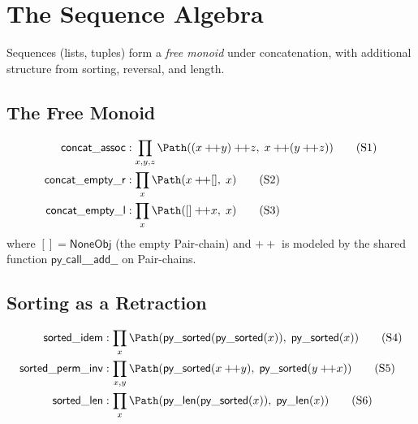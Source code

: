 \section{The Sequence Algebra}

Sequences (lists, tuples) form a \emph{free monoid} under
concatenation, with additional structure from sorting, reversal,
and length.

\subsection{The Free Monoid}

\begin{definition}
\begin{align}
  \mathsf{concat\_assoc} &: \prod_{x,y,z}
    \Path((x +\!\!+ y) +\!\!+ z,\;
          x +\!\!+ (y +\!\!+ z))
    \tag{S1} \\
  \mathsf{concat\_empty\_r} &: \prod_x
    \Path(x +\!\!+ [],\; x)
    \tag{S2} \\
  \mathsf{concat\_empty\_l} &: \prod_x
    \Path([] +\!\!+ x,\; x)
    \tag{S3}
\end{align}
where $[] = \mathsf{NoneObj}$ (the empty Pair-chain) and
$+\!\!+$ is modeled by the shared function $\mathsf{py\_call\_\_\_add\_\_}$
on Pair-chains.
\end{definition}

\subsection{Sorting as a Retraction}

\begin{definition}
\begin{align}
  \mathsf{sorted\_idem} &: \prod_x
    \Path(\mathsf{py\_sorted}(\mathsf{py\_sorted}(x)),\;
          \mathsf{py\_sorted}(x))
    \tag{S4} \\
  \mathsf{sorted\_perm\_inv} &: \prod_{x,y}
    \Path(\mathsf{py\_sorted}(x +\!\!+ y),\;
          \mathsf{py\_sorted}(y +\!\!+ x))
    \tag{S5} \\
  \mathsf{sorted\_len} &: \prod_x
    \Path(\mathsf{py\_len}(\mathsf{py\_sorted}(x)),\;
          \mathsf{py\_len}(x))
    \tag{S6}
\end{align}
\end{definition}

